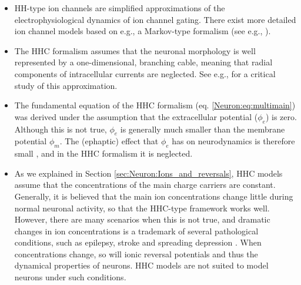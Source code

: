 \begin{itemize}
\item HH-type ion channels are simplified approximations of the electrophysiological dynamics of ion channel gating. There exist more detailed ion channel models based on e.g., a Markov-type formalism (see e.g., \cite{Destexhe1994, balbi2017}). 

\item The HHC formalism assumes that the neuronal morphology is well represented by a one-dimensional, branching cable, meaning that radial components of intracellular currents are neglected. See e.g.,\cite{lindsay2004maxwell} for a critical study of this approximation.

\item The fundamental equation of the HHC formalism (eq. \ref{Neuron:eq:multimain}) was derived under the assumption that the extracellular potential ($\phi_e$) is zero. Although this is not true, $\phi_e$ is generally much smaller than the membrane potential $\phi_m$. The (ephaptic) effect that $\phi_e$ has on neurodynamics is therefore small \cite{anastassiou2015}, and in the HHC formalism it is neglected.

\item As we explained in Section \ref{sec:Neuron:Ions_and_reversals}, HHC models assume that the concentrations of the main charge carriers are constant. Generally, it is believed that the main ion concentrations change little during normal neuronal activity, so that the HHC-type framework works well. However, there are many scenarios when this is not true, and dramatic changes in ion concentrations is a trademark of several pathological conditions, such as epilepsy, stroke and spreading depression \cite{Somjen2001, Zandt2015, Ayata2015}. When concentrations change, so will ionic reversal potentials and thus the dynamical properties of neurons. HHC models are not suited to model neurons under such conditions.

\end{itemize}

